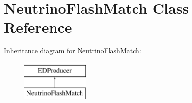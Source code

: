 \hypertarget{classNeutrinoFlashMatch}{\section{Neutrino\-Flash\-Match Class Reference}
\label{classNeutrinoFlashMatch}
}
Inheritance diagram for Neutrino\-Flash\-Match\-:\begin{figure}[H]
\begin{center}
\leavevmode
\includegraphics[height=2.000000cm]{classNeutrinoFlashMatch}
\end{center}
\end{figure}
